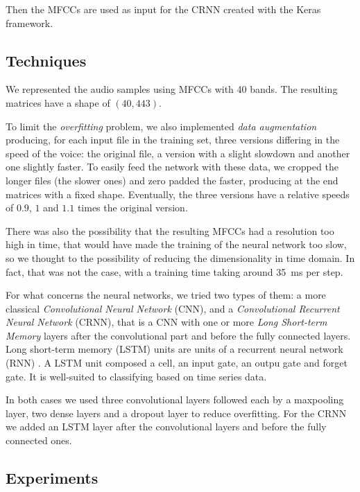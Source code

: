\documentclass{article}
\begin{document}
Then the MFCCs are used as input for the CRNN created with the Keras framework.

\subsection{Techniques}
\label{subsec:dnn-tech}
We represented the audio samples using MFCCs with 40 bands. The resulting matrices have a shape of $(40, 443)$.

To limit the \emph{overfitting} problem, we also implemented \emph{data augmentation} producing, for each input file in the training set, three versions differing in the speed of the voice: the original file, a version with a slight slowdown and another one slightly faster. To easily feed the network with these data, we cropped the longer files (the slower ones) and zero padded the faster, producing at the end matrices with a fixed shape.
Eventually, the three versions have a relative speeds of $0.9$, $1$ and $1.1$ times the original version.

There was also the possibility that the resulting MFCCs had a resolution too high in time, that would have made the training of the neural network too slow, so we thought to the possibility of reducing the dimensionality in time domain. In fact, that was not the case, with a training time taking around \SI{35}{\milli\second} per step. 

For what concerns the neural networks, we tried two types of them: a more classical \emph{Convolutional Neural Network} (CNN), and a \emph{Convolutional Recurrent Neural Network} (CRNN), that is a CNN with one or more \emph{Long Short-term Memory} layers after the convolutional part and before the fully connected layers. Long short-term memory (LSTM) units are units of a recurrent neural network (RNN) . A LSTM unit composed a cell, an input gate, an outpu gate and forget gate. It is well-suited to classifying based on time series data.

In both cases we used three convolutional layers followed each by a maxpooling layer, two dense layers and a dropout layer to reduce overfitting. For the CRNN we added an LSTM layer after the convolutional layers and before the fully connected ones. 

\subsection{Experiments}
\label{subsec:dnn-experiments}
\end{document}
